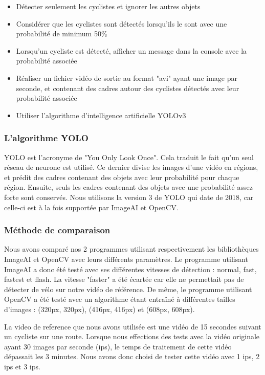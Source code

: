 \begin{itemize}
    \item Détecter seulement les cyclistes et ignorer les autres objets
    \item Considérer que les cyclistes sont détectés lorsqu'ils le sont avec une probabilité de minimum 50\%
    \item Lorsqu'un cycliste est détecté, afficher un message dans la console avec la probabilité associée
    \item Réaliser un fichier vidéo de sortie au format "avi" ayant une image par seconde, et contenant des cadres autour des cyclistes détectés avec leur probabilité associée
    \item Utiliser l'algorithme d'intelligence artificielle YOLOv3
\end{itemize}

\subsubsection{L'algorithme YOLO}
\label{sec:comparaisonIA:methode_recherche:yolo}

YOLO est l'acronyme de "You Only Look Once". Cela traduit le fait qu'un seul réseau de neurone est utilisé. \cite{Yolov3}
Ce dernier divise les images d'une vidéo en régions, et prédit des cadres contenant des objets avec leur probabilité pour chaque région.
Ensuite, seuls les cadres contenant des objets avec une probabilité assez forte sont conservés.
Nous utilisons la version 3 de YOLO qui date de 2018, car celle-ci est à la fois supportée par ImageAI et OpenCV.

\subsubsection{Méthode de comparaison}
\label{sec:comparaisonIA:methode_recherche:methode_comparaison}

Nous avons comparé nos 2 programmes utilisant respectivement les bibliothèques ImageAI et OpenCV avec leurs différents paramètres.
Le programme utilisant ImageAI a donc été testé avec ses différentes vitesses de détection : normal, fast, fastest et flash.
La vitesse "faster" a été écartée car elle ne permettait pas de détecter de vélo sur notre vidéo de référence.
De même, le programme utilisant OpenCV a été testé avec un algorithme étant entraîné à différentes tailles d'images : 
(320px, 320px), (416px, 416px) et (608px, 608px).

La \gls{video de reference} que nous avons utilisée est une vidéo de 15 secondes suivant un cycliste sur une route.
Lorsque nous effections des tests avec la vidéo originale ayant 30 images par seconde (ips),
le temps de traitement de cette vidéo dépassait les 3 minutes.
Nous avons donc choisi de tester cette vidéo avec 1 ips, 2 ips et 3 ips.

